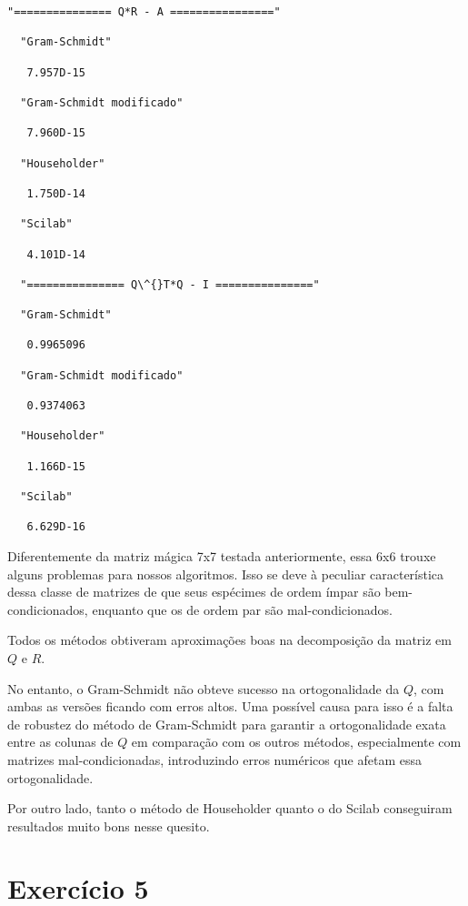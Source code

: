 \documentclass[11pt]{article}
\begin{document}
    \begin{Verbatim}[commandchars=\\\{\}]
  "=============== Q*R - A ================"

  "Gram-Schmidt"

   7.957D-15

  "Gram-Schmidt modificado"

   7.960D-15

  "Householder"

   1.750D-14

  "Scilab"

   4.101D-14

  "=============== Q\^{}T*Q - I ==============="

  "Gram-Schmidt"

   0.9965096

  "Gram-Schmidt modificado"

   0.9374063

  "Householder"

   1.166D-15

  "Scilab"

   6.629D-16
    \end{Verbatim}

    Diferentemente da matriz mágica 7x7 testada anteriormente, essa 6x6
trouxe alguns problemas para nossos algoritmos. Isso se deve à peculiar
característica dessa classe de matrizes de que seus espécimes de ordem
ímpar são bem-condicionados, enquanto que os de ordem par são
mal-condicionados.

Todos os métodos obtiveram aproximações boas na decomposição da matriz
em \(Q\) e \(R\).

No entanto, o Gram-Schmidt não obteve sucesso na ortogonalidade da
\(Q\), com ambas as versões ficando com erros altos. Uma possível causa
para isso é a falta de robustez do método de Gram-Schmidt para garantir
a ortogonalidade exata entre as colunas de \(Q\) em comparação com os
outros métodos, especialmente com matrizes mal-condicionadas,
introduzindo erros numéricos que afetam essa ortogonalidade.

Por outro lado, tanto o método de Householder quanto o do Scilab
conseguiram resultados muito bons nesse quesito.

\hypertarget{exercuxedcio-5}{%
\section{Exercício 5}\label{exercuxedcio-5}}
\end{document}
